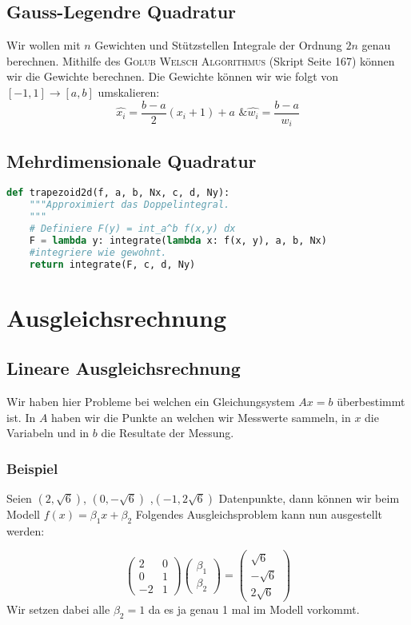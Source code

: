 \documentclass{sciposter}
\begin{document}
\begin{multicols}{3}
\subsection*{Gauss-Legendre Quadratur}
Wir wollen mit $n$ Gewichten und Stützstellen Integrale der Ordnung $2n$ genau berechnen.
Mithilfe des \textsc{Golub Welsch Algorithmus} (Skript Seite 167) können wir die Gewichte berechnen.
Die Gewichte können wir wie folgt von $[-1,1]\to [a,b]$ umskalieren:
$$\hat{x_i} = \frac{b-a}{2}(x_i + 1) + a \text{  \&  }  \hat{w_i} = \frac{b-a}{w_i}$$  

\subsection*{Mehrdimensionale Quadratur}

\begin{lstlisting}[language=Python]
def trapezoid2d(f, a, b, Nx, c, d, Ny):
	"""Approximiert das Doppelintegral.
	"""
	# Definiere F(y) = int_a^b f(x,y) dx
	F = lambda y: integrate(lambda x: f(x, y), a, b, Nx)
	#integriere wie gewohnt.
	return integrate(F, c, d, Ny) 

\end{lstlisting}



\section{Ausgleichsrechnung}
\subsection*{Lineare Ausgleichsrechnung}
Wir haben hier Probleme bei welchen ein Gleichungsystem  $Ax = b$ überbestimmt ist. 
In $A$ haben wir die Punkte an welchen wir Messwerte sammeln, in $x$ die Variabeln und in $b$ die Resultate der Messung.
\subsubsection*{Beispiel}
Seien $(2, \sqrt{6})$, $(0, -\sqrt{6})$ ,$(-1,2\sqrt{6})$ Datenpunkte, dann können wir beim Modell $f(x) = \beta_1 x + \beta_2$ Folgendes Ausgleichsproblem kann nun ausgestellt werden: 

\begin{equation*}
\begin{pmatrix}
2 & 0\\
0 & 1\\
-2 & 1
\end{pmatrix}
\begin{pmatrix}
\beta_1\\
\beta_2
\end{pmatrix}
=
\begin{pmatrix}
\sqrt{6} \\
-\sqrt{6} \\
2\sqrt{6}
\end{pmatrix}
\end{equation*}
Wir setzen dabei alle $\beta_2 = 1$ da es ja genau 1 mal im Modell vorkommt.


\end{multicols}
\end{document}
